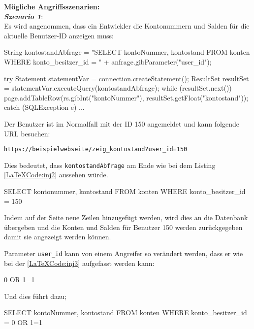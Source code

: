 \textbf{Mögliche Angriffsszenarien:}\\

\textbf{\textit{Szenario 1}}:\\
Es wird angenommen, dass ein Entwickler die Kontonummern und Salden für die aktuelle Benutzer-ID anzeigen muss\cite{vcinj16}:\\


\begin{LaTeXCode}[caption={SQL Abfrage Beispiel 1},captionpos=b, label=LaTeXCode:inj1][numbers=none]
String kontostandAbfrage = 
"SELECT kontoNummer, kontostand FROM konten WHERE konto\_besitzer\_id = " 
+ anfrage.gibParameter("user_id");

try
{
	Statement statementVar = connection.createStatement();
	ResultSet resultSet = statementVar.executeQuery(kontostandAbfrage);
	while (resultSet.next()) {
		page.addTableRow(rs.gibInt("kontoNummer"), resultSet.getFloat("kontostand"));
	}
} catch (SQLException e) { ... }
\end{LaTeXCode}

Der Benutzer ist im Normalfall mit der ID 150 angemeldet und kann folgende URL besuchen:

\texttt{https://beispielwebseite/zeig\_kontostand?user\_id=150}

Dies bedeutet, dass \texttt{kontostandAbfrage} am Ende wie bei dem Listing \ref{LaTeXCode:inj2} aussehen würde.

\begin{LaTeXCode}[caption={Kontostand Abfrage},captionpos=b, label=LaTeXCode:inj2][numbers=none]
SELECT kontonummer, kontostand FROM konten WHERE konto_besitzer_id = 150
\end{LaTeXCode}

Indem auf der Seite neue Zeilen hinzugefügt werden, wird dies an die Datenbank übergeben und die Konten und Salden für Benutzer 150 werden zurückgegeben damit sie angezeigt werden können.

Parameter \texttt{user\_id} kann von einem Angreifer so verändert werden, dass er wie bei der \ref{LaTeXCode:inj3} aufgefasst werden kann:

\begin{LaTeXCode}[caption={Parameter},captionpos=b, label=LaTeXCode:inj3][numbers=none]
0 OR 1=1
\end{LaTeXCode}

Und dies führt dazu;

	\begin{LaTeXCode}[caption={Kontostand Abfrage},captionpos=b, label=LaTeXCode:inj4][numbers=none]
SELECT kontoNummer, kontostand FROM konten WHERE konto_besitzer_id = 0 OR 1=1
\end{LaTeXCode}

